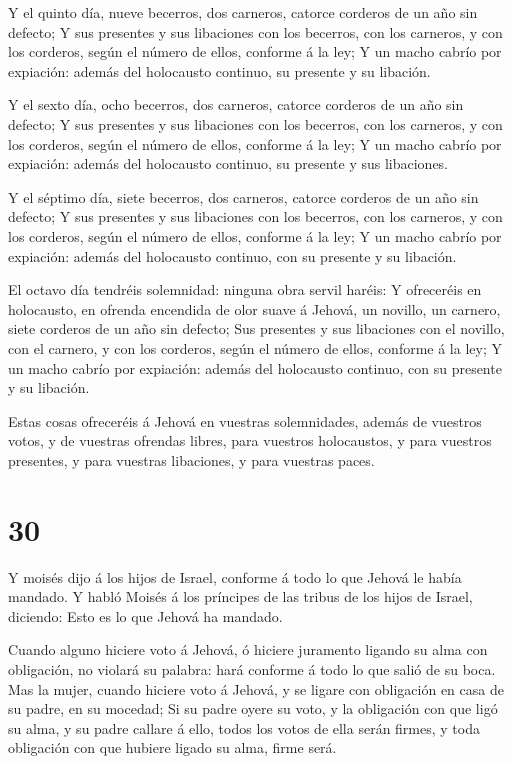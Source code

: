  Y el quinto día, nueve becerros, dos carneros, catorce
corderos de un año sin defecto;  Y sus presentes y sus
libaciones con los becerros, con los carneros, y con los corderos, según
el número de ellos, conforme á la ley;  Y un macho cabrío
por expiación: además del holocausto continuo, su presente y su
libación.

 Y el sexto día, ocho becerros, dos carneros, catorce
corderos de un año sin defecto;  Y sus presentes y sus
libaciones con los becerros, con los carneros, y con los corderos, según
el número de ellos, conforme á la ley;  Y un macho cabrío
por expiación: además del holocausto continuo, su presente y sus
libaciones.

 Y el séptimo día, siete becerros, dos carneros, catorce
corderos de un año sin defecto;  Y sus presentes y sus
libaciones con los becerros, con los carneros, y con los corderos, según
el número de ellos, conforme á la ley;  Y un macho cabrío
por expiación: además del holocausto continuo, con su presente y su
libación.

 El octavo día tendréis solemnidad: ninguna obra servil
haréis:  Y ofreceréis en holocausto, en ofrenda encendida
de olor suave á Jehová, un novillo, un carnero, siete corderos de un año
sin defecto;  Sus presentes y sus libaciones con el
novillo, con el carnero, y con los corderos, según el número de ellos,
conforme á la ley;  Y un macho cabrío por expiación: además
del holocausto continuo, con su presente y su libación.

 Estas cosas ofreceréis á Jehová en vuestras solemnidades,
además de vuestros votos, y de vuestras ofrendas libres, para vuestros
holocaustos, y para vuestros presentes, y para vuestras libaciones, y
para vuestras paces.


\hypertarget{section-29}{%
\section{30}\label{section-29}}

 Y moisés dijo á los hijos de Israel, conforme á todo lo que
Jehová le había mandado.  Y habló Moisés á los príncipes de
las tribus de los hijos de Israel, diciendo: Esto es lo que Jehová ha
mandado.

 Cuando alguno hiciere voto á Jehová, ó hiciere juramento
ligando su alma con obligación, no violará su palabra: hará conforme á
todo lo que salió de su boca.  Mas la mujer, cuando hiciere
voto á Jehová, y se ligare con obligación en casa de su padre, en su
mocedad;  Si su padre oyere su voto, y la obligación con que
ligó su alma, y su padre callare á ello, todos los votos de ella serán
firmes, y toda obligación con que hubiere ligado su alma, firme será.

